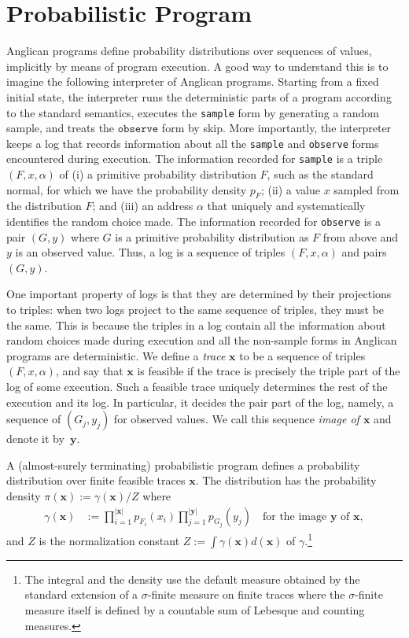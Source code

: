 \documentclass[preprint]{sigplanconf}
\begin{document}
\section{Probabilistic Program}
\label{sec:pp-def}

Anglican programs define probability distributions 
over sequences of values, implicitly by means of program execution.
A good way to understand this is to imagine the following 
interpreter of Anglican programs. Starting from a fixed initial state,
the interpreter runs the deterministic parts of a program 
according to the standard semantics, executes the \texttt{sample} form by
generating a random sample, and treats the $\texttt{observe}$ form by skip.
More importantly, the interpreter keeps a log that records
information about all the \texttt{sample} and \texttt{observe} forms encountered 
during execution. The information recorded for \texttt{sample} is 
a triple $(F,x,\alpha)$ of (i) a primitive probability distribution $F$, 
such as the standard normal, for which we have 
the probability density $p_F$; (ii) a value $x$ sampled from the distribution $F$; 
and (iii) an address $\alpha$ that uniquely and systematically identifies the random 
choice made. The information recorded for \texttt{observe} is a pair $(G,y)$ where $G$
is a primitive probability distribution as $F$ from above and $y$ is an 
observed value. Thus, a log is a sequence of triples $(F,x,\alpha)$ and 
pairs $(G,y)$.

One important property of logs is that they are determined by 
their projections to triples: when two logs project to the same
sequence of triples, they must be the same. This is because
the triples in a log contain all the information about random choices
made during execution and all the non-sample forms in Anglican programs
are deterministic. We define a \textit{trace} $\pmb{x}$ to be a sequence
of triples $(F,x,\alpha)$, and say that $\pmb{x}$ is feasible if
the trace is precisely the triple part of the log of some execution. 
Such a feasible trace uniquely determines the rest of the execution and its log.
In particular, it decides the pair part of the log, namely, 
a sequence of $(G_j, y_j)$ for observed values. We call this sequence \textit{image of $\pmb{x}$} 
and denote it by~$\pmb{y}$. 

A (almost-surely terminating) probabilistic program defines a probability distribution 
over finite feasible traces $\pmb{x}$. The distribution has the probability density 
$\pi(\pmb{x}) := \gamma(\pmb{x}) / Z$ where 
\begin{align}
  \gamma(\pmb{x}) 
  &:= 
  \prod_{i=1}^{\left|\pmb{x}\right|}
  p_{F_i}(x_i) \prod_{j=1}^{\left|\pmb{y}\right|}p_{G_j}(y_{j})
  \quad \mbox{for the image $\pmb{y}$ of $\pmb{x}$}, 
  \label{eqn:p-trace}
\end{align}
and $Z$ is the normalization constant $Z := \int \gamma(\pmb{x})d(\pmb{x})$
of $\gamma$.\footnote{The integral and the density use the default measure obtained by the standard extension of
a $\sigma$-finite measure on finite traces where the $\sigma$-finite measure itself is defined by
a countable sum of Lebesque and counting measures.}
\end{document}

